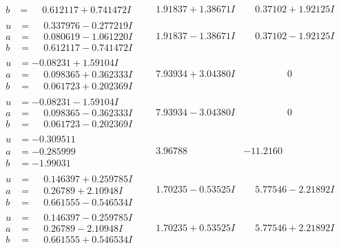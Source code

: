 \documentclass[1p]{elsarticle_modified}
\theoremstyle{definition}
\begin{document}
$$\begin{array}{c|c|c}
\begin{aligned}
b &= \phantom{-}0.612117 + 0.741472 I\end{aligned}
 & \phantom{-}1.91837 + 1.38671 I & \phantom{-}0.37102 + 1.92125 I \\ \hline\begin{aligned}
u &= \phantom{-}0.337976 - 0.277219 I \\
a &= \phantom{-}0.080619 - 1.061220 I \\
b &= \phantom{-}0.612117 - 0.741472 I\end{aligned}
 & \phantom{-}1.91837 - 1.38671 I & \phantom{-}0.37102 - 1.92125 I \\ \hline\begin{aligned}
u &= -0.08231 + 1.59104 I \\
a &= \phantom{-}0.098365 + 0.362333 I \\
b &= \phantom{-}0.061723 + 0.202369 I\end{aligned}
 & \phantom{-}7.93934 + 3.04380 I & \phantom{-0.000000 } 0 \\ \hline\begin{aligned}
u &= -0.08231 - 1.59104 I \\
a &= \phantom{-}0.098365 - 0.362333 I \\
b &= \phantom{-}0.061723 - 0.202369 I\end{aligned}
 & \phantom{-}7.93934 - 3.04380 I & \phantom{-0.000000 } 0 \\ \hline\begin{aligned}
u &= -0.309511\phantom{ +0.000000I} \\
a &= -0.285999\phantom{ +0.000000I} \\
b &= -1.99031\phantom{ +0.000000I}\end{aligned}
 & \phantom{-}3.96788\phantom{ +0.000000I} & -11.2160\phantom{ +0.000000I} \\ \hline\begin{aligned}
u &= \phantom{-}0.146397 + 0.259785 I \\
a &= \phantom{-}0.26789 + 2.10948 I \\
b &= \phantom{-}0.661555 - 0.546534 I\end{aligned}
 & \phantom{-}1.70235 - 0.53525 I & \phantom{-}5.77546 - 2.21892 I \\ \hline\begin{aligned}
u &= \phantom{-}0.146397 - 0.259785 I \\
a &= \phantom{-}0.26789 - 2.10948 I \\
b &= \phantom{-}0.661555 + 0.546534 I\end{aligned}
 & \phantom{-}1.70235 + 0.53525 I & \phantom{-}5.77546 + 2.21892 I \\ \hline\begin{aligned}

\end{aligned}
\end{array}$$
\end{document}
